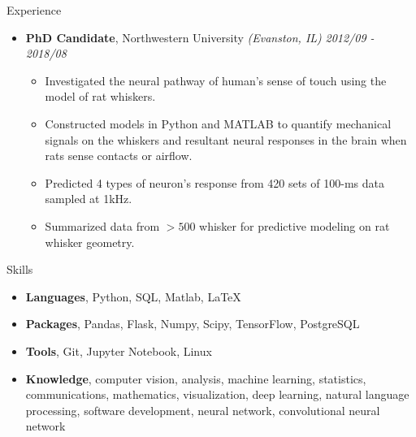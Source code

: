 \documentclass{resume} %
\begin{document}
\begin{rSection}{Experience}
\begin{itemize}
	\item {\bf PhD Candidate}{, Northwestern University \textit{(Evanston, IL)}} \hfill {\em 2012/09 - 2018/08}\\
	\vspace{-5mm}
	\begin{itemize}
		\setlength\itemsep{-1.75em}
		\item Investigated the neural pathway of human's sense of touch using the model of rat whiskers.\\
		\item Constructed models in Python and MATLAB to quantify mechanical signals on the whiskers and resultant neural responses in the brain when rats sense contacts or airflow.\\
		\item Predicted 4 types of neuron’s response from 420 sets of 100-ms data sampled at 1kHz.\\
		\item Summarized data from $>500$ whisker for predictive modeling on rat whisker geometry. 		
	\end{itemize}

	
	\end{itemize}

\end{rSection}

\begin{rSection}{Skills}
\begin{itemize}
	\item {\bf Languages}{, Python, SQL, Matlab, LaTeX}
	\item {\bf Packages}{, Pandas, Flask, Numpy, Scipy, TensorFlow, PostgreSQL}
	\item {\bf Tools}{, Git, Jupyter Notebook, Linux}
	\item {\bf Knowledge}{, computer vision, analysis, machine learning, statistics, communications, mathematics, visualization, deep learning, natural language processing, software development, neural network, convolutional neural network}
	
\end{itemize}
\end{rSection}
\end{document}
